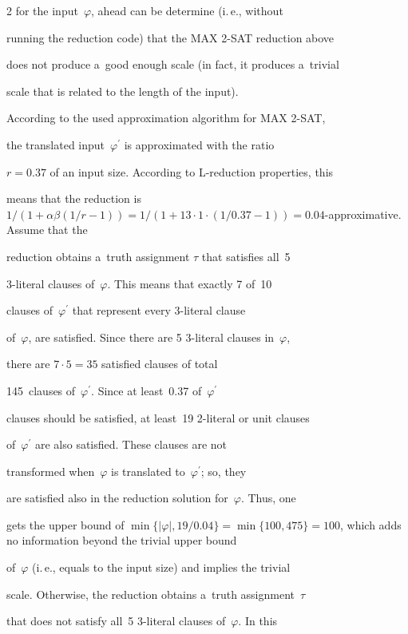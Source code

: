 \begin{multicols}{2}
for the input~$\varphi$, ahead can be determine (i.\,e., without


running the reduction code) that the {MAX 2-SAT} reduction above


does not produce a~good enough scale (in fact, it produces a~trivial


scale that is related to the length of the input).





According to the used approximation algorithm for {MAX 2-SAT},


the translated input~$\varphi^\prime$ is approximated with the ratio


$r=0.37$ of an input size. According to L-reduction properties, this


means that the reduction is $1/(1+\alpha\beta(1/r-1)) =


1/(1+13\cdot1\cdot(1/0.37-1)) = 0.04$-approximative. Assume that the


reduction obtains a~truth assignment $\tau$ that satisfies all~5\


3-literal clauses of~$\varphi$. This means that exactly 7 of~10


clauses of~$\varphi^\prime$ that represent every 3-literal clause


of~$\varphi$, are satisfied. Since there are 5 3-literal clauses in~$\varphi$,


there are $7\cdot5 = 35$ satisfied clauses of total


145~clauses of~$\varphi^\prime$. Since at least~0.37 of~$\varphi^\prime$


clauses should be satisfied, at least~19 2-literal or unit clauses


of~$\varphi^\prime$ are also satisfied. These clauses are not


transformed when~$\varphi$ is translated to~$\varphi^\prime$; so, they


are satisfied also in the reduction solution for~$\varphi$. Thus, one


gets the upper bound of $\min\{|\varphi|,19/0.04\} = \min\{100,475\} =


100$, which adds no information beyond the trivial upper bound


of~$\varphi$ (i.\,e., equals to the input size) and implies the trivial


scale. Otherwise, the reduction obtains a~truth assignment~$\tau$


that does not satisfy all~5 3-literal clauses of~$\varphi$. In this



\end{multicols}
